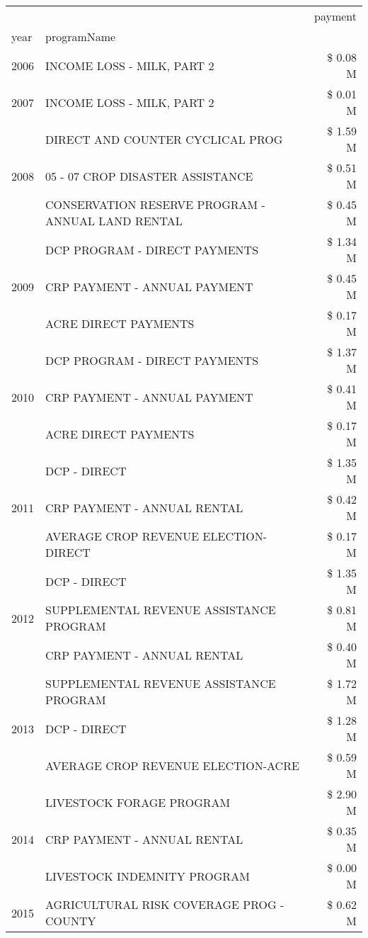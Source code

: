 \begin{tabular}{llr}
\toprule
 &  & payment \\
year & programName &  \\
\midrule
2006 & INCOME LOSS - MILK, PART 2 & \$ 0.08 M \\
\cline{1-3}
2007 & INCOME LOSS - MILK, PART 2 & \$ 0.01 M \\
\cline{1-3}
\multirow[t]{3}{*}{2008} & DIRECT AND COUNTER CYCLICAL PROG & \$ 1.59 M \\
 & 05 - 07 CROP DISASTER ASSISTANCE & \$ 0.51 M \\
 & CONSERVATION RESERVE PROGRAM - ANNUAL LAND RENTAL & \$ 0.45 M \\
\cline{1-3}
\multirow[t]{3}{*}{2009} & DCP PROGRAM - DIRECT PAYMENTS & \$ 1.34 M \\
 & CRP PAYMENT - ANNUAL PAYMENT & \$ 0.45 M \\
 & ACRE DIRECT PAYMENTS & \$ 0.17 M \\
\cline{1-3}
\multirow[t]{3}{*}{2010} & DCP PROGRAM - DIRECT PAYMENTS & \$ 1.37 M \\
 & CRP PAYMENT - ANNUAL PAYMENT & \$ 0.41 M \\
 & ACRE DIRECT PAYMENTS & \$ 0.17 M \\
\cline{1-3}
\multirow[t]{3}{*}{2011} & DCP - DIRECT & \$ 1.35 M \\
 & CRP PAYMENT - ANNUAL RENTAL & \$ 0.42 M \\
 & AVERAGE CROP REVENUE ELECTION-DIRECT & \$ 0.17 M \\
\cline{1-3}
\multirow[t]{3}{*}{2012} & DCP - DIRECT & \$ 1.35 M \\
 & SUPPLEMENTAL REVENUE ASSISTANCE PROGRAM & \$ 0.81 M \\
 & CRP PAYMENT - ANNUAL RENTAL & \$ 0.40 M \\
\cline{1-3}
\multirow[t]{3}{*}{2013} & SUPPLEMENTAL REVENUE ASSISTANCE PROGRAM & \$ 1.72 M \\
 & DCP - DIRECT & \$ 1.28 M \\
 & AVERAGE CROP REVENUE ELECTION-ACRE & \$ 0.59 M \\
\cline{1-3}
\multirow[t]{3}{*}{2014} & LIVESTOCK FORAGE PROGRAM & \$ 2.90 M \\
 & CRP PAYMENT - ANNUAL RENTAL & \$ 0.35 M \\
 & LIVESTOCK INDEMNITY PROGRAM & \$ 0.00 M \\
\cline{1-3}
\multirow[t]{3}{*}{2015} & AGRICULTURAL RISK COVERAGE PROG - COUNTY & \$ 0.62 M \\

\end{tabular}

